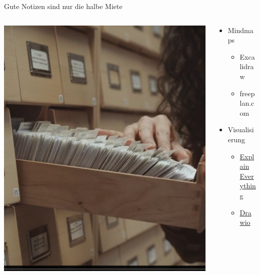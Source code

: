\begin{frame}{Gute Notizen sind nur die halbe Miete}
    \begin{columns}
        \begin{column}{0.4\textwidth}
            \includegraphics[width=\textwidth]{graphics/Zettelkasten.png}
        \end{column}
        \begin{column}[t]{0.6\textwidth}
            \vspace{-3cm}
            \begin{itemize}[]
                \item Mindmaps
                \begin{itemize}
                    \item Excalidraw
                    \item freeplan.com
                \end{itemize}
                \item Visualisierung
                \begin{itemize}
                    \item \href{https://explaineverything.com/}{Explain Everything}
                    \item \href{https://www.drawio.com/}{Drawio}
                \end{itemize}
            \end{itemize} 


            
        \end{column}        
    \end{columns}    
\end{frame}

